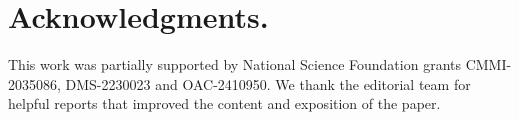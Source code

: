 \documentclass[stsy,sglanonrev]{informs4}
\begin{document}
\begin{APPENDICES}



\end{APPENDICES}

\clearpage

\section*{Acknowledgments.}
This work was partially supported by National Science Foundation grants CMMI-2035086, DMS-2230023 and OAC-2410950. We thank the editorial team for helpful reports that improved the content and exposition of the paper.



\end{document}
